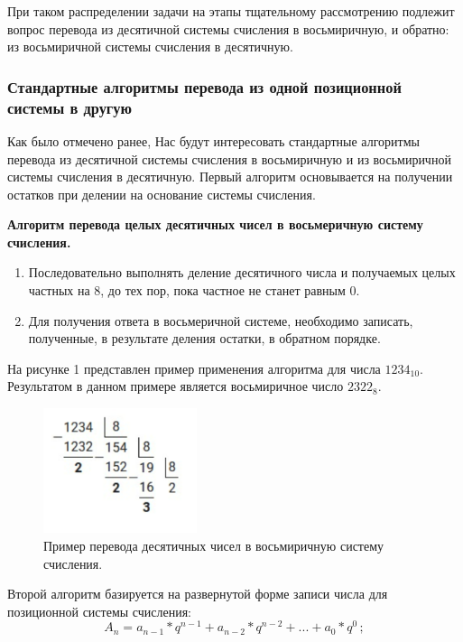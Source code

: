 \documentclass[14pt, russian]{scrartcl}
\begin{document}
При таком распределении задачи на этапы тщательному рассмотрению подлежит вопрос перевода из десятичной системы счисления в восьмиричную, и обратно: из восьмиричной системы счисления в десятичную.

\subsubsection{Стандартные алгоритмы перевода из одной позиционной системы в другую}
Как было отмечено ранее, Нас будут интересовать стандартные алгоритмы перевода из десятичной системы счисления в восьмиричную и из восьмиричной системы счисления в десятичную. Первый алгоритм основывается на получении остатков при делении на основание системы счисления. 

\textbf{Алгоритм перевода целых десятичных чисел в восьмеричную систему счисления.}
\begin{enumerate}
\item Последовательно выполнять деление десятичного числа и получаемых целых частных на 8, до тех пор, пока частное не станет равным 0.
\item Для получения ответа в восьмеричной системе, необходимо записать, полученные, в результате деления остатки, в обратном порядке.
\end{enumerate}

На рисунке 1 представлен пример применения алгоритма для числа $1234_{10}$. Результатом в данном примере является восьмиричное число $2322_8$.

\begin{figure}[!htb]
\centering
  \noindent
\includegraphics[width=0.4\textwidth]{decimal_to_octal.png}
\caption{Пример перевода десятичных чисел в восьмиричную систему счисления.}
\label{fig:example1}
\end{figure}

Второй алгоритм базируется на развернутой форме записи числа для позиционной системы счисления:
\label{Example:MathFont}
\begin{equation}\label{eq:1}
A_n = a_{n-1} * q^{n-1} + a_{n-2} * q^{n-2} + ... + a_0 * q^0\,;
\end{equation} 
\end{document}
